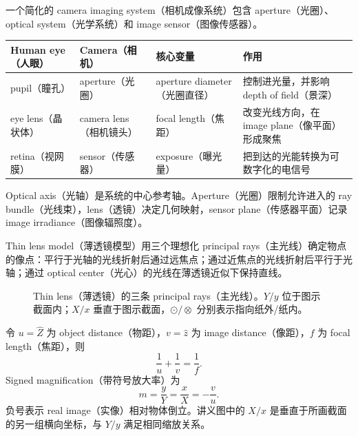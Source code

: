 一个简化的 camera imaging system（相机成像系统）包含 aperture（光圈）、optical system（光学系统）和 image sensor（图像传感器）。

\begin{center}
\small
\begin{tabularx}{\textwidth}{@{}>{\raggedright\arraybackslash}p{2.5cm}>{\raggedright\arraybackslash}p{2.7cm}>{\raggedright\arraybackslash}p{3.1cm}>{\raggedright\arraybackslash}X@{}}
  \toprule
  Human eye（人眼） & Camera（相机） & 核心变量 & 作用 \\
  \midrule
  pupil（瞳孔） & aperture（光圈） & aperture diameter（光圈直径） & 控制进光量，并影响 depth of field（景深） \\
  eye lens（晶状体） & camera lens（相机镜头） & focal length（焦距） & 改变光线方向，在 image plane（像平面）形成聚焦 \\
  retina（视网膜） & sensor（传感器） & exposure（曝光量） & 把到达的光能转换为可数字化的电信号 \\
  \bottomrule
\end{tabularx}
\end{center}

Optical axis（光轴）是系统的中心参考轴。Aperture（光圈）限制允许进入的 ray bundle（光线束），lens（透镜）决定几何映射，sensor plane（传感器平面）记录 image irradiance（图像辐照度）。


Thin lens model（薄透镜模型）用三个理想化 principal rays（主光线）确定物点的像点：平行于光轴的光线折射后通过远焦点；通过近焦点的光线折射后平行于光轴；通过 optical center（光心）的光线在薄透镜近似下保持直线。

\begin{figure}[htbp]
  \centering
  \resizebox{0.94\textwidth}{!}{}
  \caption{Thin lens（薄透镜）的三条 principal rays（主光线）。$Y/y$ 位于图示截面内；$X/x$ 垂直于图示截面，$\odot/\otimes$ 分别表示指向纸外/纸内。}
  \label{fig:sc4061-l01-thin-lens}
\end{figure}

\begin{samepage}
令 $u=\hat Z$ 为 object distance（物距），$v=\hat z$ 为 image distance（像距），$f$ 为 focal length（焦距），则
\[
  \boxed{\frac{1}{u}+\frac{1}{v}=\frac{1}{f}}.
\]
Signed magnification（带符号放大率）为
\[
  \boxed{m=\frac{y}{Y}=\frac{x}{X}=-\frac{v}{u}}.
\]
负号表示 real image（实像）相对物体倒立。讲义图中的 $X/x$ 是垂直于所画截面的另一组横向坐标，与 $Y/y$ 满足相同缩放关系。
\end{samepage}

